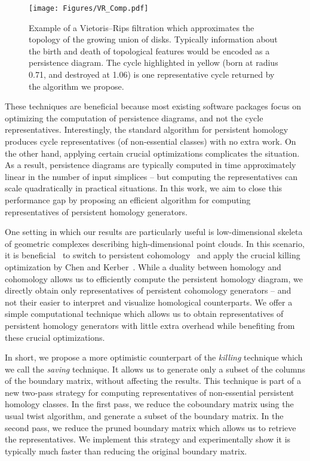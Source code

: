 \begin{figure}
    \centering
    \texttt{[image: Figures/VR\_Comp.pdf]}
    \caption{Example of a Vietoris--Rips filtration which approximates the topology of the growing union of disks. Typically information about the birth and death of topological features would be encoded as a persistence diagram. The cycle highlighted in yellow (born at radius 0.71, and destroyed at 1.06) is one representative cycle returned by the algorithm we propose.}
    \label{fig:VRex}
\end{figure}

These techniques are beneficial because most existing software packages focus on optimizing the computation of persistence diagrams, and not the cycle representatives. Interestingly, the standard algorithm for persistent homology produces cycle representatives (of non-essential classes) with no extra work. On the other hand, applying certain crucial optimizations complicates the situation. As a result, persistence diagrams are typically computed in time approximately linear in the number of input simplices -- but computing the representatives can scale quadratically in practical situations. In this work, we aim to close this performance gap by proposing an efficient algorithm for computing representatives of persistent homology generators.

One setting in which our results are particularly useful is low-dimensional skeleta of geometric complexes describing high-dimensional point clouds. In this scenario, it is beneficial~\cite{phat} to switch to persistent cohomology~\cite{deSilva_2011} and apply the crucial killing optimization by Chen and Kerber~\cite{Chen2011twist}. While a duality between homology and cohomology allows us to efficiently compute the persistent homology diagram, we directly obtain only representatives of persistent cohomology generators -- and not their easier to interpret and visualize homological counterparts. We offer a simple computational technique which allows us to obtain representatives of persistent homology generators with little extra overhead while benefiting from these crucial optimizations.

 In short, we propose a more optimistic counterpart of the \emph{killing} technique which we call the \emph{saving} technique. It allows us to generate only a subset of the columns of the boundary matrix, without affecting the results. This technique is part of a new two-pass strategy for computing representatives of non-essential persistent homology classes. In the first pass, we reduce the coboundary matrix using the usual twist algorithm, and generate a subset of the boundary matrix. In the second pass, we reduce the pruned boundary matrix which allows us to retrieve the representatives. We implement this strategy and experimentally show it is typically much faster than reducing the original boundary matrix.


